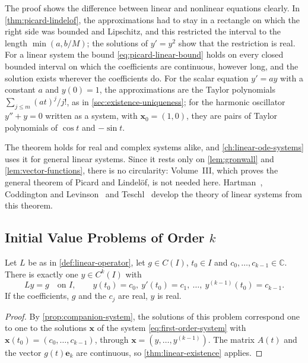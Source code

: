The proof shows the difference between linear and nonlinear equations clearly. In \cref{thm:picard-lindelof}, the approximations had to stay in a rectangle on which the right side was bounded and Lipschitz, and this restricted the interval to the length $\min(a,b/M)$; the solutions of $y'=y^2$ show that the restriction is real. For a linear system the bound \eqref{eq:picard-linear-bound} holds on every closed bounded interval on which the coefficients are continuous, however long, and the solution exists wherever the coefficients do. For the scalar equation $y'=ay$ with a constant $a$ and $y(0)=1$, the approximations are the Taylor polynomials $\sum_{j\le m}(at)^j/j!$, as in \cref{sec:existence-uniqueness}; for the harmonic oscillator $y''+y=0$ written as a system, with $\mathbf x_0=(1,0)$, they are pairs of Taylor polynomials of $\cos t$ and $-\sin t$.

The theorem holds for real and complex systems alike, and \cref{ch:linear-ode-systems} uses it for general linear systems. Since it rests only on \cref{lem:gronwall} and \cref{lem:vector-functions}, there is no circularity: Volume~III, which proves the general theorem of Picard and Lindel\"of, is not needed here. Hartman~\cite[Chap.~IV]{hartman2002}, Coddington and Levinson~\cite[Chap.~3]{coddington1955} and Teschl~\cite[Chap.~3]{teschl2012} develop the theory of linear systems from this theorem.

\subsection{Initial Value Problems of Order \texorpdfstring{$k$}{k}}

\begin{corollary}
\label{cor:higher-existence}
Let $L$ be as in \cref{def:linear-operator}, let $g\in C(I)$, $t_0\in I$ and $c_0,\ldots,c_{k-1}\in\mathbb C$. There is exactly one $y\in C^k(I)$ with
\[
Ly=g\quad\text{on }I,\qquad y(t_0)=c_0,\ y'(t_0)=c_1,\ \ldots,\ y^{(k-1)}(t_0)=c_{k-1} .
\]
If the coefficients, $g$ and the $c_j$ are real, $y$ is real.
\end{corollary}

\begin{proof}
By \cref{prop:companion-system}, the solutions of this problem correspond one to one to the solutions $\mathbf x$ of the system \eqref{eq:first-order-system} with $\mathbf x(t_0)=(c_0,\ldots,c_{k-1})$, through $\mathbf x=(y,\ldots,y^{(k-1)})$. The matrix $A(t)$ and the vector $g(t)\mathbf e_k$ are continuous, so \cref{thm:linear-existence} applies.
\end{proof}

